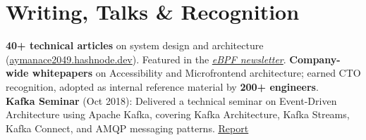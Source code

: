 \documentclass[letterpaper,11pt]{article}
\begin{document}
\section{Writing, Talks \& Recognition}
\small
\textbf{40+ technical articles} on system design and architecture (\href{https://aymanace2049.hashnode.dev}{aymanace2049.hashnode.dev}). Featured in the \textit{\href{https://aymanace2049.hashnode.dev/ebpf-unleash-the-linux-kernel}{eBPF newsletter}}.
\textbf{Company-wide whitepapers} on Accessibility and Microfrontend architecture; earned CTO recognition, adopted as internal reference material by \textbf{200+ engineers}. \\[3pt]
\textbf{Kafka Seminar} (Oct 2018): Delivered a technical seminar on Event-Driven Architecture using Apache Kafka, covering Kafka Architecture, Kafka Streams, Kafka Connect, and AMQP messaging patterns. \href{https://drive.google.com/file/d/1txqBQZaRxxT7wu5csBuIHUfi8DrRvUMU/view?usp=sharing}{\underline{Report}}
\end{document}
